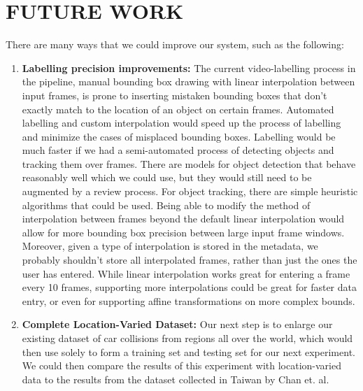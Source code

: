 \documentclass[letterpaper, 10 pt, conference]{ieeeconf}
\begin{document}
\section{FUTURE WORK}

There are many ways that we could improve our system, such as the following:
\begin{enumerate}
\item \textbf{Labelling precision improvements:} The current video-labelling process in the pipeline, manual bounding box drawing with linear interpolation between input frames, is prone to inserting mistaken bounding boxes that don't exactly match to the location of an object on certain frames. Automated labelling and custom interpolation would speed up the process of labelling and minimize the cases of misplaced bounding boxes. Labelling would be much faster if we had a semi-automated process of detecting objects and tracking them over frames. There are models for object detection that behave reasonably well which we could use, but they would still need to be augmented by a review process. For object tracking, there are simple heuristic algorithms that could be used. Being able to modify the method of interpolation between frames beyond the default linear interpolation would allow for more bounding box precision between large input frame windows. Moreover, given a type of interpolation is stored in the metadata, we probably shouldn't store all interpolated frames, rather than just the ones the user has entered. While linear interpolation works great for entering a frame every 10 frames, supporting more interpolations could be great for faster data entry, or even for supporting affine transformations on more complex bounds.

\item \textbf{Complete Location-Varied Dataset:} Our next step is to enlarge our existing dataset of car collisions from regions all over the world, which would then use solely to form a training set and testing set for our next experiment. We could then compare the results of this experiment with location-varied data to the results from the dataset collected in Taiwan by Chan et. al.

\end{enumerate}

\addtolength{\textheight}{-12cm}


\nocite{*}


\end{document}

